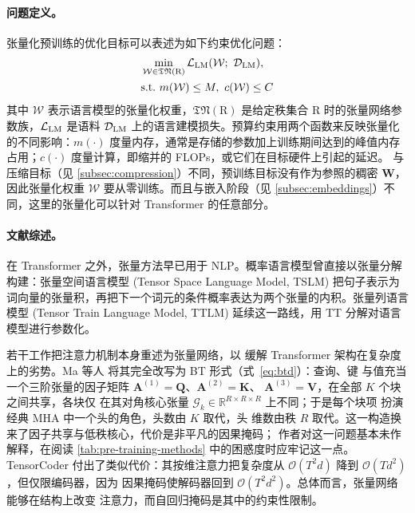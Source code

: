\documentclass[11pt]{article}
\newcommand{\R}{\mathbb{R}}
\newcommand{\ten}[1]{\mathcal{#1}}
\newcommand{\mat}[1]{\mathbf{#1}}
\newcommand{\set}[1]{\mathrm{#1}}
\begin{document}
\paragraph{问题定义。}

张量化预训练的优化目标可以表述为如下约束优化问题：
\begin{equation}
\begin{aligned}
& \min_{\ten{W} \in \mathfrak{TN}(\set{R})} \mathcal{L}_{\rm LM} (\ten{W}; \ \mathcal{D}_{\rm LM}), \\
& {\rm s.t.} ~ m(\ten{W}) \leq M,\ c(\ten{W}) \leq C
\end{aligned}
\end{equation}
其中 $\ten{W}$ 表示语言模型的张量化权重，$\mathfrak{TN}(\set{R})$ 是给定秩集合 $\set{R}$ 时的张量网络参数族，$\mathcal{L}_{\rm LM}$ 是语料 $\mathcal{D}_{\rm LM}$ 上的语言建模损失。预算约束用两个函数来反映张量化的不同影响：$m(\cdot)$ 度量内存，通常是存储的参数加上训练期间达到的峰值内存占用；$c(\cdot)$ 度量计算，即缩并的 FLOPs，或它们在目标硬件上引起的延迟。
与压缩目标（见 \cref{subsec:compression}）不同，预训练目标没有作为参照的稠密 $\mat{W}$，因此张量化权重 $\ten{W}$ 要从零训练。而且与嵌入阶段（见 \cref{subsec:embeddings}）不同，这里的张量化可以针对 Transformer 的任意部分。

\paragraph{文献综述。} 

在 Transformer 之外，张量方法早已用于 NLP。概率语言模型曾直接以张量分解构建：张量空间语言模型 (Tensor Space Language Model, TSLM) \cite{zhang2019tslm} 把句子表示为词向量的张量积，再把下一个词元的条件概率表达为两个张量的内积。张量列语言模型 (Tensor Train Language Model, TTLM) \cite{su2024ttlm} 延续这一路线，用 TT 分解对语言模型进行参数化。


若干工作把注意力机制本身重述为张量网络，以
缓解 Transformer 架构在复杂度上的劣势。Ma 等人
\cite{ma2019tensorized} 将其完全改写为 BT 形式（式~\eqref{eq:btd}）：查询、键
与值充当一个三阶张量的因子矩阵 $\mat{A}^{(1)} = \mat{Q}$、$\mat{A}^{(2)} = \mat{K}$、
$\mat{A}^{(3)} = \mat{V}$，在全部 $K$ 个块之间共享，各块仅
在其对角核心张量 $\ten{G}_k \in \R^{R \times R \times R}$ 上不同；于是每个块项
扮演经典 MHA 中一个头的角色，头数由 $K$ 取代，头
维数由秩 $R$ 取代。这一构造换来了因子共享与低秩核心，代价是非平凡的因果掩码；
作者对这一问题基本未作解释，在阅读
\cref{tab:pre-training-methods} 中的困惑度时应牢记这一点。TensorCoder
\cite{zhang2020tensorcoder} 付出了类似代价：其按维注意力把复杂度从 $\mathcal{O}(T^2 d)$ 降到
$\mathcal{O}(T d^2)$，但仅限编码器，因为
因果掩码使解码器回到 $\mathcal{O}(T^2 d^2)$。总体而言，张量网络能够在结构上改变
注意力，而自回归掩码是其中的约束性限制。
\end{document}
